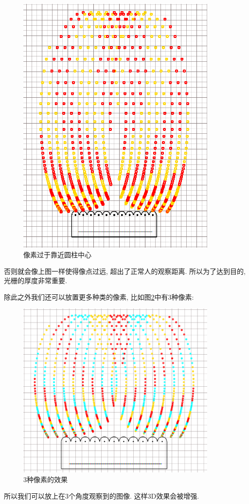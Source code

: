 \documentclass[a4paper, 11pt]{article}
\begin{document}
\begin{CJK}{UTF8}{gbsn}
\begin{figure}
  \centerline{\includegraphics[width=10cm]{229.png}}
  \caption{像素过于靠近圆柱中心}
  \label{fig:229}
\end{figure}
否则就会像上图一样使得像点过远, 超出了正常人的观察距离. 所以为了达到目的, 光栅的厚度非常重要.

除此之外我们还可以放置更多种类的像素, 比如图\ref{fig:230}中有3种像素:
\begin{figure}
  \centerline{\includegraphics[width=10cm]{230.png}}
  \caption{3种像素的效果}
  \label{fig:230}
\end{figure}
所以我们可以放上在3个角度观察到的图像. 这样3D效果会被增强.

\end{CJK}
\end{document}
